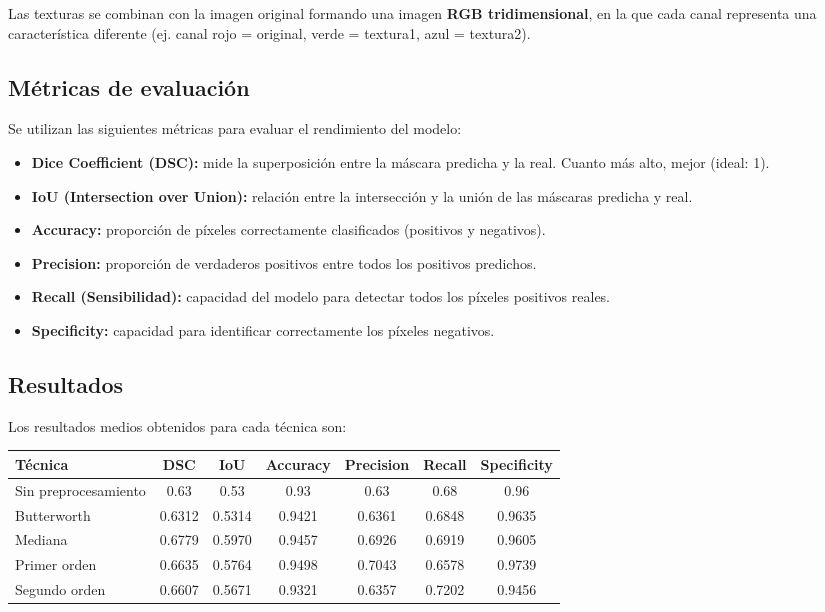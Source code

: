 \documentclass[12pt]{article}
\begin{document}
Las texturas se combinan con la imagen original formando una imagen \textbf{RGB tridimensional}, en la que cada canal representa una característica diferente (ej. canal rojo = original, verde = textura1, azul = textura2).

\subsection{Métricas de evaluación}
Se utilizan las siguientes métricas para evaluar el rendimiento del modelo:
\begin{itemize}
    \item \textbf{Dice Coefficient (DSC):} mide la superposición entre la máscara predicha y la real. Cuanto más alto, mejor (ideal: 1).
    \item \textbf{IoU (Intersection over Union):} relación entre la intersección y la unión de las máscaras predicha y real.
    \item \textbf{Accuracy:} proporción de píxeles correctamente clasificados (positivos y negativos).
    \item \textbf{Precision:} proporción de verdaderos positivos entre todos los positivos predichos.
    \item \textbf{Recall (Sensibilidad):} capacidad del modelo para detectar todos los píxeles positivos reales.
    \item \textbf{Specificity:} capacidad para identificar correctamente los píxeles negativos.
\end{itemize}

\subsection{Resultados}
Los resultados medios obtenidos para cada técnica son:

\begin{center}
\begin{tabular}{|l|c|c|c|c|c|c|}
\hline
\textbf{Técnica} & \textbf{DSC} & \textbf{IoU} & \textbf{Accuracy} & \textbf{Precision} & \textbf{Recall} & \textbf{Specificity} \\
\hline
Sin preprocesamiento & 0.63  & 0.53  & 0.93     & 0.63      & 0.68   & 0.96        \\
Butterworth          & 0.6312& 0.5314& 0.9421   & 0.6361    & 0.6848 & 0.9635      \\
Mediana              & 0.6779& 0.5970& 0.9457   & 0.6926    & 0.6919 & 0.9605      \\
Primer orden         & 0.6635& 0.5764& 0.9498   & 0.7043    & 0.6578 & 0.9739      \\
Segundo orden        & 0.6607& 0.5671& 0.9321   & 0.6357    & 0.7202 & 0.9456      \\
\hline
\end{tabular}
\end{center}
\end{document}

